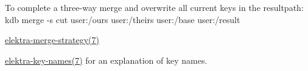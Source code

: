 To complete a three-\/way merge and overwrite all current keys in the {\ttfamily resultpath}\+:~\newline
 {\ttfamily kdb merge -\/s cut user\+:/ours user\+:/theirs user\+:/base user\+:/result}~\newline



\begin{DoxyItemize}
\item \hyperlink{doc_help_elektra-merge-strategy_md}{elektra-\/merge-\/strategy(7)}
\item \hyperlink{doc_help_elektra-key-names_md}{elektra-\/key-\/names(7)} for an explanation of key names. 
\end{DoxyItemize}